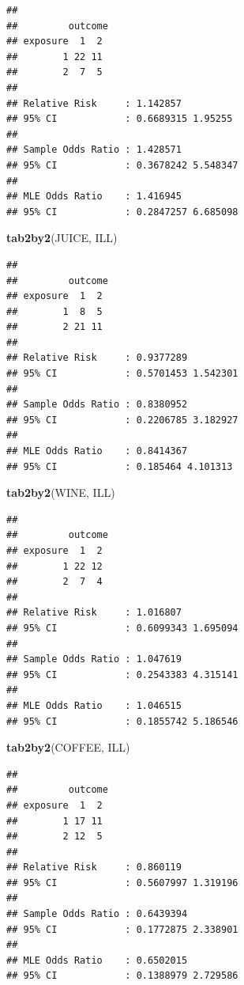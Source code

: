 \documentclass[12pt,a4paper]{book}
\newenvironment{Shaded}{\begin{snugshade}}{\end{snugshade}}
\newcommand{\KeywordTok}[1]{\textcolor[rgb]{0.13,0.29,0.53}{\textbf{#1}}}
\newcommand{\NormalTok}[1]{#1}
\theoremstyle{definition}
\theoremstyle{definition}
\theoremstyle{definition}
\theoremstyle{remark}
\begin{document}
\begin{verbatim}
## 
##         outcome
## exposure  1  2
##        1 22 11
##        2  7  5
## 
## Relative Risk     : 1.142857 
## 95% CI            : 0.6689315 1.95255 
## 
## Sample Odds Ratio : 1.428571 
## 95% CI            : 0.3678242 5.548347 
## 
## MLE Odds Ratio    : 1.416945 
## 95% CI            : 0.2847257 6.685098
\end{verbatim}

\begin{Shaded}
\begin{Highlighting}[]
\KeywordTok{tab2by2}\NormalTok{(JUICE, ILL)}
\end{Highlighting}
\end{Shaded}

\begin{verbatim}
## 
##         outcome
## exposure  1  2
##        1  8  5
##        2 21 11
## 
## Relative Risk     : 0.9377289 
## 95% CI            : 0.5701453 1.542301 
## 
## Sample Odds Ratio : 0.8380952 
## 95% CI            : 0.2206785 3.182927 
## 
## MLE Odds Ratio    : 0.8414367 
## 95% CI            : 0.185464 4.101313
\end{verbatim}

\newpage

\begin{Shaded}
\begin{Highlighting}[]
\KeywordTok{tab2by2}\NormalTok{(WINE, ILL)}
\end{Highlighting}
\end{Shaded}

\begin{verbatim}
## 
##         outcome
## exposure  1  2
##        1 22 12
##        2  7  4
## 
## Relative Risk     : 1.016807 
## 95% CI            : 0.6099343 1.695094 
## 
## Sample Odds Ratio : 1.047619 
## 95% CI            : 0.2543383 4.315141 
## 
## MLE Odds Ratio    : 1.046515 
## 95% CI            : 0.1855742 5.186546
\end{verbatim}

\begin{Shaded}
\begin{Highlighting}[]
\KeywordTok{tab2by2}\NormalTok{(COFFEE, ILL)}
\end{Highlighting}
\end{Shaded}

\begin{verbatim}
## 
##         outcome
## exposure  1  2
##        1 17 11
##        2 12  5
## 
## Relative Risk     : 0.860119 
## 95% CI            : 0.5607997 1.319196 
## 
## Sample Odds Ratio : 0.6439394 
## 95% CI            : 0.1772875 2.338901 
## 
## MLE Odds Ratio    : 0.6502015 
## 95% CI            : 0.1388979 2.729586
\end{verbatim}
\end{document}
